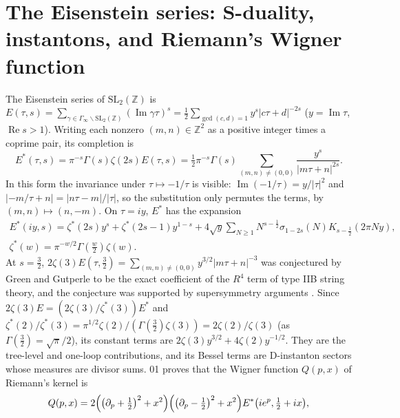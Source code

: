 \documentclass[11pt]{article}
\theoremstyle{definition}\newtheorem{definition}[theorem]{Definition}
\theoremstyle{remark}\newtheorem{remark}[theorem]{Remark}
\renewcommand{\Re}{\operatorname{Re}}\renewcommand{\Im}{\operatorname{Im}}
\begin{document}
\section{The Eisenstein series: S-duality, instantons, and Riemann's Wigner function}\label{sec:eis}
The Eisenstein series of $\mathrm{SL}_2(\mathbb Z)$ is $E(\tau,s)=\sum_{\gamma\in\Gamma_\infty\backslash\mathrm{SL}_2(\mathbb Z)}(\Im\gamma\tau)^s=\frac12\sum_{\gcd(c,d)=1}y^s|c\tau+d|^{-2s}$ ($y=\Im\tau$, $\Re s>1$). Writing each nonzero $(m,n)\in\mathbb Z^2$ as a positive integer times a coprime pair, its completion is
\[
E^*(\tau,s)=\pi^{-s}\Gamma(s)\zeta(2s)E(\tau,s)=\tfrac12\pi^{-s}\Gamma(s)\sum_{(m,n)\ne(0,0)}\frac{y^s}{|m\tau+n|^{2s}} .
\]
In this form the invariance under $\tau\mapsto-1/\tau$ is visible: $\Im(-1/\tau)=y/|\tau|^2$ and $|-m/\tau+n|=|n\tau-m|/|\tau|$, so the substitution only permutes the terms, by $(m,n)\mapsto(n,-m)$. On $\tau=iy$, $E^*$ has the expansion \cite[\S3.4]{Iwaniec}
\begin{gather*}
E^*(iy,s)=\zeta^*(2s)y^s+\zeta^*(2s-1)y^{1-s}+4\sqrt y\sum_{N\ge1}N^{s-\frac12}\sigma_{1-2s}(N)K_{s-\frac12}(2\pi Ny),\\
\zeta^*(w)=\pi^{-w/2}\Gamma(\tfrac w2)\zeta(w).
\end{gather*}
At $s=\frac32$, $2\zeta(3)E(\tau,\frac32)=\sum_{(m,n)\ne(0,0)}y^{3/2}|m\tau+n|^{-3}$ was conjectured by Green and Gutperle \cite{GreenGutperle} to be the exact coefficient of the $R^4$ term of type IIB string theory, and the conjecture was supported by supersymmetry arguments \cite{GreenSethi}. Since $2\zeta(3)E=(2\zeta(3)/\zeta^*(3))E^*$ and $\zeta^*(2)/\zeta^*(3)=\pi^{1/2}\zeta(2)/(\Gamma(\frac32)\zeta(3))=2\zeta(2)/\zeta(3)$ (as $\Gamma(\frac32)=\sqrt\pi/2$), its constant terms are $2\zeta(3)y^{3/2}+4\zeta(2)y^{-1/2}$. They are the tree-level and one-loop contributions, and its Bessel terms are D-instanton sectors whose measures are divisor sums. 01 proves that the Wigner function $Q(p,x)$ of Riemann's kernel is \cite{SMath}
\begin{equation}\label{eq:QE}
Q(p,x)=2\Bigl(\bigl(\partial_p+\tfrac12\bigr)^2+x^2\Bigr)\Bigl(\bigl(\partial_p-\tfrac12\bigr)^2+x^2\Bigr)E^*\bigl(ie^p,\tfrac12+ix\bigr),
\end{equation}
\end{document}
